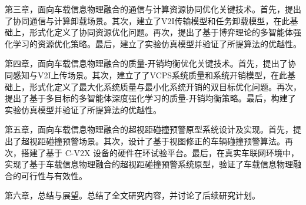 第三章，面向车载信息物理融合的通信与计算资源协同优化关键技术。首先，提出了协同通信与计算卸载场景。其次，建立了V2I传输模型和任务卸载模型，在此基础上，形式化定义了协同资源优化问题。再次，提出了基于博弈理论的多智能体强化学习的资源优化策略。最后，建立了实验仿真模型并验证了所提算法的优越性。

第四章，面向车载信息物理融合的质量-开销均衡优化关键技术。首先，提出了协同感知与V2I上传场景。其次，建立了了VCPS系统质量和系统开销模型，在此基础上，形式化定义了最大化系统质量与最小化系统开销的双目标优化问题。再次，提出了基于多目标的多智能体深度强化学习的质量-开销均衡策略。最后，构建了实验仿真模型并验证了所提算法的优越性。

第五章，面向车载信息物理融合的超视距碰撞预警原型系统设计及实现。首先，提出了超视距碰撞预警场景。其次，设计了基于视图修正的车辆碰撞预警算法。再次，搭建了基于 C-V2X 设备的硬件在环试验平台。最后，在真实车联网环境中，实现了基于车载信息物理融合的超视距碰撞预警系统原型，验证了车载信息物理融合的可行性与有效性。

第六章，总结与展望。总结了全文研究内容，并讨论了后续研究计划。






